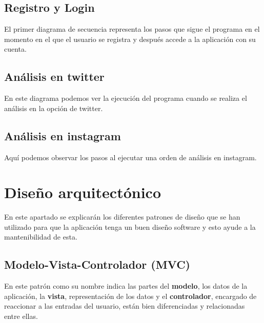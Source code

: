 \subsection{Registro y Login}
El primer diagrama de secuencia representa los pasos que sigue el programa en el momento en el que el usuario se registra y después accede a la aplicación con su cuenta.


\newpage
\subsection{Análisis en twitter}
En este diagrama podemos ver la ejecución del programa cuando se realiza el análisis en la opción de twitter.


\newpage
\subsection{Análisis en instagram}
Aquí podemos observar los pasos al ejecutar una orden de análisis en instagram. 


\newpage
\section{Diseño arquitectónico}
En este apartado se explicarán los diferentes patrones de diseño que se han utilizado para que la aplicación tenga un buen diseño software y esto ayude a la mantenibilidad de esta.

\subsection{Modelo-Vista-Controlador (MVC)}
En este patrón como su nombre indica las partes del \textbf{modelo}, los datos de la aplicación, la \textbf{vista}, representación de los datos y el \textbf{controlador}, encargado de reaccionar a las entradas del usuario, están bien diferenciadas y relacionadas entre ellas. \cite{apuntesMVC}


